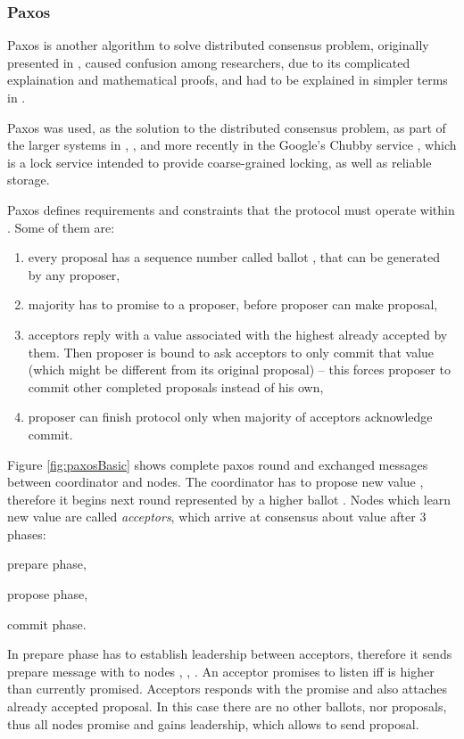 \subsubsection{Paxos}
Paxos is another algorithm to solve distributed consensus problem, originally presented in \cite{Lamport1998partTimeParliment}, caused confusion among researchers, due to its complicated explaination and mathematical proofs, and had to be explained in simpler terms in \cite{lamport2001paxosMadeSimple}. 

Paxos was used, as the solution to the distributed consensus problem, as part of the larger systems in \cite{chandra2007PaxosMadeLive}, \cite{lampson1996build}, and more recently in the Google's Chubby service \cite{burrows2006chubby}, which is a lock service intended to provide coarse-grained locking, as well as reliable storage. 

Paxos defines requirements and constraints that the protocol must operate within \cite{lamport2001paxosMadeSimple}. Some of them are: \begin{enumerate}
  \item every proposal has a sequence number called ballot \ballot, that can be generated by any proposer,
  \item majority has to promise to a proposer, before proposer can make proposal,
  \item acceptors reply with a value associated with the highest \ballot already accepted by them. Then proposer is bound to ask acceptors to only commit that value (which might be different from its original proposal) -- this forces proposer to commit other completed proposals instead of his own,\label{sec:mpp:requirements:finishInProgress}
  \item proposer can finish protocol only when majority of acceptors acknowledge commit.
\end{enumerate}

Figure \ref{fig:paxosBasic} shows complete paxos round and exchanged messages between coordinator and nodes. The coordinator \coordinator has to propose new value \paxosValue, therefore it begins next \paxos round represented by a higher ballot \ballot. Nodes which learn new value are called \emph{acceptors}, which arrive at consensus about value \paxosValue after $3$ phases:
\begin{enumerate*}[label=(\alph*)]
\item prepare phase,
\item propose phase,
\item commit phase.
\end{enumerate*}
In prepare phase \coordinator has to establish leadership between acceptors, therefore it sends prepare message with \ballot to nodes , , . An acceptor promises to listen iff \ballot is higher than currently promised. Acceptors responds with the promise and also attaches already accepted proposal. In this case there are no other ballots, nor proposals, thus all nodes promise and \coordinator gains leadership, which allows \coordinator to send proposal.

